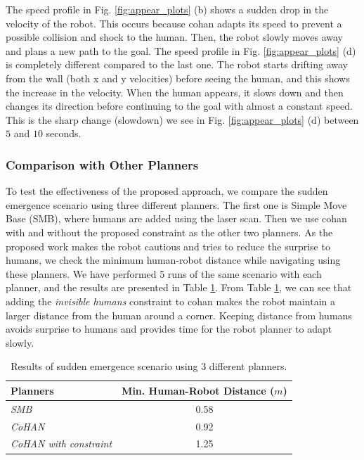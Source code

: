 The speed profile in Fig. \ref{fig:appear_plots} (b) shows a sudden drop in the velocity of the robot. This occurs because \acrshort{cohan} adapts its speed to prevent a possible collision and shock to the human. Then, the robot slowly moves away and plans a new path to the goal. The speed profile in Fig. \ref{fig:appear_plots} (d) is completely different compared to the last one. The robot starts drifting away from the wall (both x and y velocities) before seeing the human, and this shows the increase in the velocity. When the human appears, it slows down and then changes its direction before continuing to the goal with almost a constant speed. This is the sharp change (slowdown) we see in Fig. \ref{fig:appear_plots} (d) between $5$ and $10$ seconds.


\subsubsection{Comparison with Other Planners}
To test the effectiveness of the proposed approach, we compare the sudden emergence scenario using three different planners. The first one is Simple Move Base (SMB), where humans are added using the laser scan. Then we use \acrshort{cohan} with and without the proposed constraint as the other two planners. As the proposed work makes the robot cautious and tries to reduce the surprise to humans, we check the minimum human-robot distance while navigating using these planners. We have performed 5 runs of the same scenario with each planner, and the results are presented in Table \ref{compare_table}. From Table \ref{compare_table}, we can see that adding the \textit{invisible humans} constraint to \acrshort{cohan} makes the robot maintain a larger distance from the human around a corner. Keeping distance from humans avoids surprise to humans and provides time for the robot planner to adapt slowly.
\begin{table}[h!]
    \centering
    \begin{tabular}{|l|c|}
    \hline
    \textbf{Planners} & \textbf{Min. Human-Robot Distance ($m$)}\\
    \hline
      \textit{SMB} & 0.58\\
    \hline
     \textit{CoHAN} & 0.92\\
    \hline
     \textit{CoHAN with constraint} & 1.25\\
    \hline
    \end{tabular}
    \caption{Results of sudden emergence scenario using 3 different planners.}
    \label{compare_table}
\end{table}

